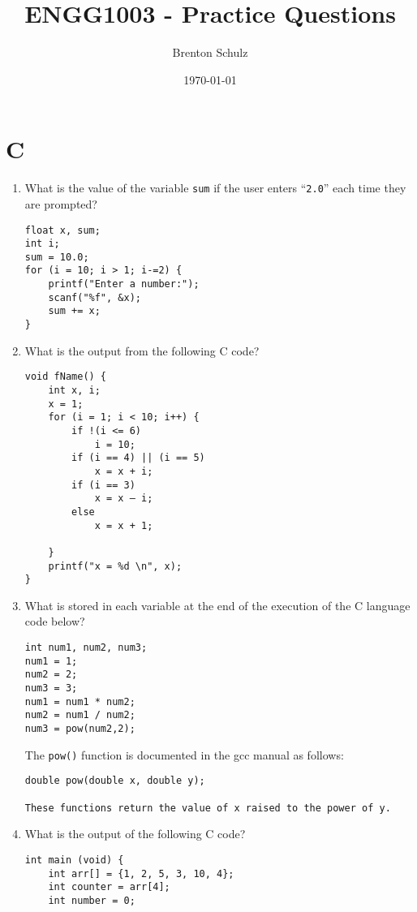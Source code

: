 \documentclass{lab}
\title{ENGG1003 - Practice Questions}
\author{Brenton Schulz}
\date{\today}
\begin{document}
\maketitle

\section{C}

\begin{enumerate}
\item What is the value of the variable \texttt{sum} if the user enters ``\texttt{2.0}'' each time they are prompted?
\begin{lstlisting}[style=CStyle]
float x, sum;
int i;
sum = 10.0;
for (i = 10; i > 1; i-=2) {
	printf("Enter a number:");
	scanf("%f", &x);
	sum += x;
}
\end{lstlisting}

\item What is the output from the following C code?

\begin{lstlisting}[style=CStyle]
void fName() {
	int x, i;
	x = 1;
	for (i = 1; i < 10; i++) {
		if !(i <= 6)
			i = 10;
		if (i == 4) || (i == 5)
			x = x + i;
		if (i == 3)
			x = x – i;
		else
			x = x + 1;

	}
	printf("x = %d \n", x);
}
\end{lstlisting}

\item What is stored in each variable at
the end of the execution of the C language code below?

\begin{lstlisting}[style=CStyle]
int num1, num2, num3;
num1 = 1;
num2 = 2;
num3 = 3;
num1 = num1 * num2;
num2 = num1 / num2;
num3 = pow(num2,2);
\end{lstlisting}

The \texttt{pow()} function is documented in the gcc manual as follows:

\begin{lstlisting}[style=pseudo]
double pow(double x, double y);

These functions return the value of x raised to the power of y.
\end{lstlisting}

\pagebreak
\item What is the output of the following C code?

\begin{lstlisting}[style=CStyle]
int main (void) {
	int arr[] = {1, 2, 5, 3, 10, 4};
	int counter = arr[4];
	int number = 0;
	

\end{lstlisting}
\end{enumerate}
\end{document}
